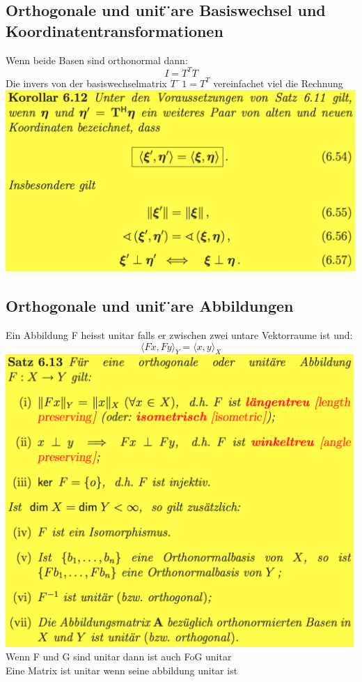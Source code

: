 \documentclass[11pt]{article}
\newcommand\back[1][-3cm]{\hspace*{#1}}
\begin{document}
\subsection{Orthogonale und unit ̈are Basiswechsel und Koordinatentransformationen}
Wenn beide Basen sind orthonormal dann:
\begin{equation}
	I=T^TT
\end{equation}
Die invers von der basiswechselmatrix $T^-1=T^T$ vereinfachet viel die Rechnung\\
\back\includegraphics{images/wechsel}
\subsection{Orthogonale und unit ̈are Abbildungen}
Ein Abbildung F heisst unitar falls er zwischen zwei untare Vektorraume ist und:
\begin{equation}
	\langle Fx, Fy\rangle_Y = \langle x,y \rangle_X
\end{equation}
\back\includegraphics{images/unitar}\\
Wenn F und G sind unitar dann ist auch FoG unitar\\
Eine Matrix ist unitar wenn seine abbildung unitar ist
\end{document}
